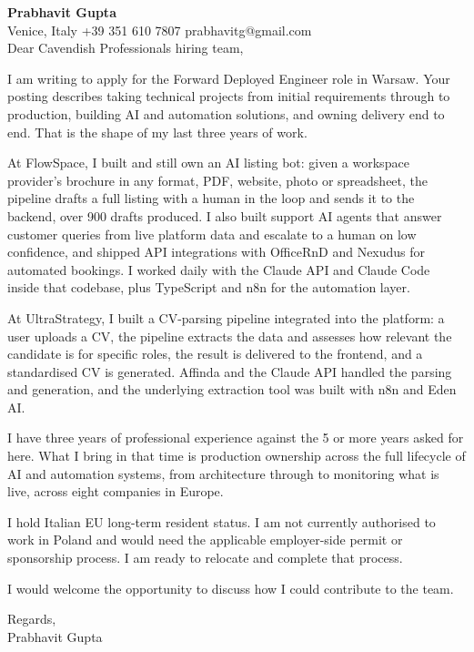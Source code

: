 \documentclass[a4paper,10.5pt]{article}
\begin{document}
\textbf{Prabhavit Gupta}\\
Venice, Italy \textbar{} +39 351 610 7807 \textbar{} prabhavitg@gmail.com\\[10pt]
Dear Cavendish Professionals hiring team,

I am writing to apply for the Forward Deployed Engineer role in Warsaw. Your posting describes taking technical projects from initial requirements through to production, building AI and automation solutions, and owning delivery end to end. That is the shape of my last three years of work.

At FlowSpace, I built and still own an AI listing bot: given a workspace provider's brochure in any format, PDF, website, photo or spreadsheet, the pipeline drafts a full listing with a human in the loop and sends it to the backend, over 900 drafts produced. I also built support AI agents that answer customer queries from live platform data and escalate to a human on low confidence, and shipped API integrations with OfficeRnD and Nexudus for automated bookings. I worked daily with the Claude API and Claude Code inside that codebase, plus TypeScript and n8n for the automation layer.

At UltraStrategy, I built a CV-parsing pipeline integrated into the platform: a user uploads a CV, the pipeline extracts the data and assesses how relevant the candidate is for specific roles, the result is delivered to the frontend, and a standardised CV is generated. Affinda and the Claude API handled the parsing and generation, and the underlying extraction tool was built with n8n and Eden AI.

I have three years of professional experience against the 5 or more years asked for here. What I bring in that time is production ownership across the full lifecycle of AI and automation systems, from architecture through to monitoring what is live, across eight companies in Europe.

I hold Italian EU long-term resident status. I am not currently authorised to work in Poland and would need the applicable employer-side permit or sponsorship process. I am ready to relocate and complete that process.

I would welcome the opportunity to discuss how I could contribute to the team.

Regards,\\
Prabhavit Gupta
\end{document}
